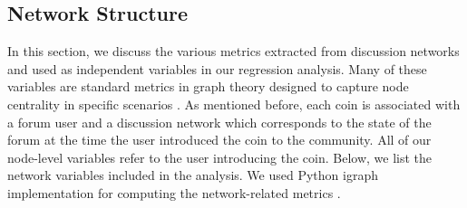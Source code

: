 \subsection{Network Structure}
In this section, we discuss the various metrics extracted from discussion networks and used as independent variables in our regression analysis. Many of these variables are standard metrics in graph theory designed to capture node centrality in specific scenarios \cite{KleinbergNetworks}. As mentioned before, each coin is associated with a forum user and a discussion network which corresponds to the state of the forum at the time the user introduced the coin to the community. All of our node-level variables refer to the user introducing the coin. Below, we list the network variables included in the analysis. We used Python igraph implementation for computing the network-related metrics \cite{igraph}.
